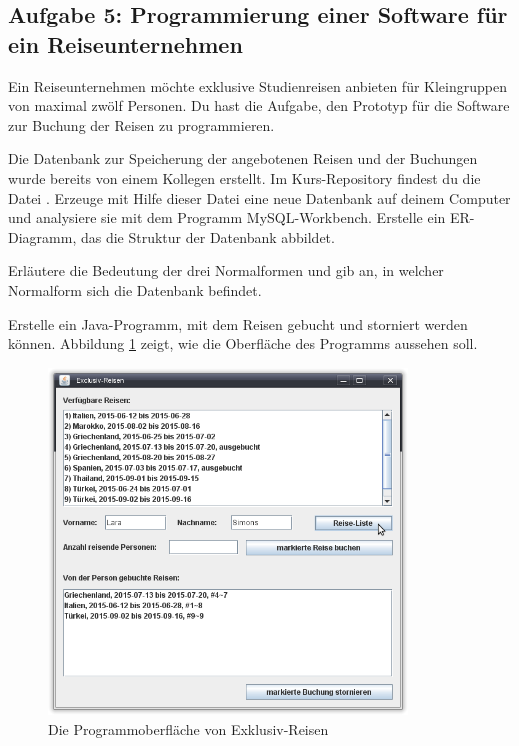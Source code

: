 \subsection{Aufgabe 5: Programmierung einer Software für ein Reiseunternehmen}

Ein Reiseunternehmen möchte exklusive Studienreisen anbieten für Kleingruppen
von maximal zwölf Personen. Du hast die Aufgabe, den Prototyp für die Software
zur Buchung der Reisen zu programmieren.

\begin{compactenum}[a)]
\item Die Datenbank zur Speicherung der angebotenen Reisen und der Buchungen
wurde bereits von einem Kollegen erstellt. Im Kurs-Repository findest du die
Datei . Erzeuge mit Hilfe dieser Datei eine neue
Datenbank auf deinem Computer und analysiere sie mit dem Programm
MySQL-Workbench. Erstelle ein ER-Diagramm, das die Struktur der Datenbank
abbildet.
\item Erläutere die Bedeutung der drei Normalformen und gib an, in welcher
Normalform sich die Datenbank befindet.
\item Erstelle ein Java-Programm, mit dem Reisen gebucht und storniert werden
 können. Abbildung \ref{fig:exklusivreisen} zeigt, wie die Oberfläche des
 Programms aussehen soll.
 
 \begin{figure}[h]
 \centering
 \includegraphics[width=0.85\textwidth]{./inf/SEKII/38_JavaSQL_Wiederholung/ExklusivReisenAufgabe5.png}
 \caption{Die Programmoberfläche von \glqq Exklusiv-Reisen\grqq}
 \label{fig:exklusivreisen}
 \end{figure}
 

\end{compactenum}
